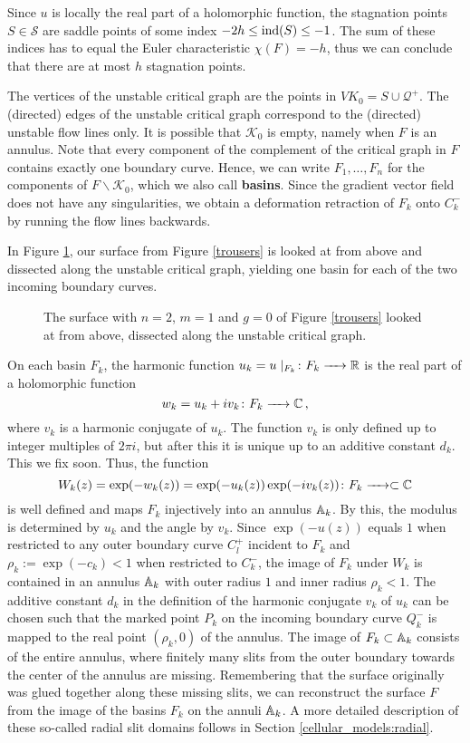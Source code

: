 Since $u$ is locally the real part of a holomorphic function,
the stagnation points $S \in \mathcal S$ are saddle points of some index $-2h \leq \operatorname{ind}(S) \leq -1$.
The sum of these indices has to equal the Euler characteristic $\chi(F)= -h$, 
thus we can conclude that there are at most $h$ stagnation points.

The vertices of the unstable critical graph are the points in $VK_0 = S \cup \mathcal Q^+$.
The (directed) edges of the unstable critical graph correspond to the (directed) unstable flow lines only.
It is possible that $\mathcal K_0$ is empty, namely when $F$ is an annulus.
Note that every component of the complement of the critical graph in $F$ contains exactly one boundary curve.
Hence, we can write $F_1, \dotsc, F_n$ for the components of $F \backslash \mathcal K_0$, which we also call \textbf{basins}.
Since the gradient vector field does not have any singularities,
we obtain a deformation retraction of $F_k$ onto $C^-_k$ by running the flow lines backwards.

In Figure \ref{trousers_flat}, our surface from Figure \ref{trousers} is looked at from above and dissected along the unstable critical graph,
yielding one basin for each of the two incoming boundary curves.

\begin{figure}[ht]
    \centering
    \def\svgwidth{.7\columnwidth}
    
    \caption{
        \label{trousers_flat}
        The surface with $n = 2$, $m = 1$ and $g = 0$ of Figure \ref{trousers} looked at from above, dissected along the unstable critical graph.}
\end{figure}

On each basin $F_k$, the harmonic function $u_k = u \mid_{F_k} \colon F_k \xrightarrow{\hspace{6pt}{}\hspace{6pt}} \mathbb R$ is the real part of a holomorphic function
\[
   w_k = u_k + i v_k \colon F_k \xrightarrow{\hspace{6pt}{}\hspace{6pt}} \mathbb C\,,
\]
where $v_k$ is a harmonic conjugate of $u_k$.
The function $v_k$ is only defined up to integer multiples of $2\pi i$,
but after this it is unique up to an additive constant $d_k$.
This we fix soon.
Thus, the function
\[
 W_k(z) = \exp(-w_k(z)) = \exp(-u_k(z)) \exp(-i v_k(z)) \colon F_k \xrightarrow{\hspace{6pt}{}\hspace{6pt}} \subset \mathbb C
\]
is well defined and maps $F_k$ injectively into an annulus $\mathbb A_k$. 
By this, the modulus is determined by $u_k$ and the angle by $v_k$. 
Since $\exp(-u(z))$ equals $1$ when restricted to any outer boundary curve $C^+_l$ incident to $F_k$ 
and $\rho_k := \exp(-c_k) < 1$ when restricted to $C^-_k$,
the image of $F_k$ under $W_k$ is contained in an annulus $\mathbb A_k$ with outer radius $1$ and inner radius $\rho_k < 1$.
The additive constant $d_k$ in the definition of the harmonic conjugate $v_k$ of $u_k$ 
can be chosen such that the marked point $P_k$ on the incoming boundary curve $Q^-_k$ is mapped to the real point $(\rho_k, 0)$ of the annulus.
The image of $F_k \subset \mathbb A_k$ consists of the entire annulus, 
where finitely many slits from the outer boundary towards the center of the annulus are missing.
Remembering that the surface originally was glued together along these missing slits,
we can reconstruct the surface $F$ from the image of the basins $F_k$ on the annuli $\mathbb A_k$.
A more detailed description of these so-called radial slit domains follows in Section \ref{cellular_models:radial}.

